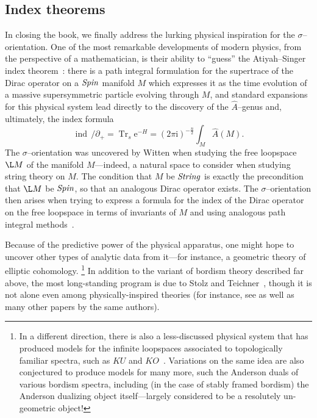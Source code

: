 \subsection*{Index theorems}

In closing the book, we finally address the lurking physical inspiration for the \(\sigma\)--orientation.
One of the most remarkable developments of modern physics, from the perspective of a mathematician, is their ability to ``guess'' the Atiyah--Singer index theorem~\cite[Section 8.6]{Takhtajan}: there is a path integral formulation for the supertrace of the Dirac operator on a \(\mathit{Spin}\) manifold \(M\) which expresses it as the time evolution of a massive supersymmetric particle evolving through \(M\), and standard expansions for this physical system lead directly to the discovery of the \(\widehat A\)--genus and, ultimately, the index formula \[\operatorname{ind}\, /\!\!\!\partial_+ = \operatorname{Tr}_s \mathrm e^{-H} = (2 \pi \mathrm i)^{-\frac{n}{2}} \int_M \widehat A(M).\]
The \(\sigma\)--orientation was uncovered by Witten when studying the free loopspace \(\L M\) of the manifold \(M\)---indeed, a natural space to consider when studying string theory on \(M\).
The condition that \(M\) be \(\mathit{String}\) is exactly the precondition that \(\L M\) be \(\mathit{Spin}\), so that an analogous Dirac operator exists.
The \(\sigma\)--orientation then arises when trying to express a formula for the index of the Dirac operator on the free loopspace in terms of invariants of \(M\) and using analogous path integral methods~\cite{SegalEll}.

Because of the predictive power of the physical apparatus, one might hope to uncover other types of analytic data from it---for instance, a geometric theory of elliptic cohomology.%
\footnote{%
In a different direction, there is also a less-discussed physical system that has produced models for the infinite loopspaces associated to topologically familiar spectra, such as \(KU\) and \(KO\)~\cite{Kitaev}.
Variations on the same idea are also conjectured to produce models for many more, such the Anderson duals of various bordism spectra, including (in the case of stably framed bordism) the Anderson dualizing object itself---largely considered to be a resolutely un-geometric object!
}
In addition to the variant of bordism theory described far above, the most long-standing program is due to Stolz and Teichner~\cite{StolzTeichnerWhatIs,StolzTeichnerSusy}, though it is not alone even among physically-inspired theories (for instance, see \cite{DouglasHenriques} as well as many other papers by the same authors).

